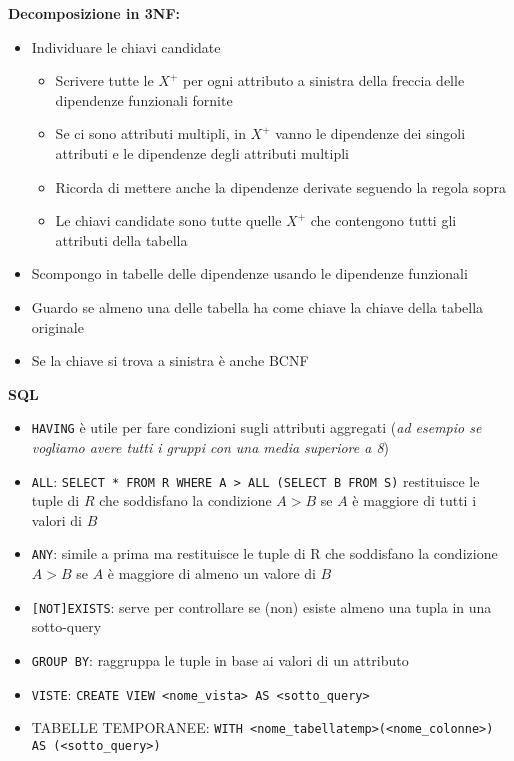 \documentclass[10pt]{article}
\begin{document}
\textbf{Decomposizione in 3NF:}
\begin{itemize}
    \item Individuare le chiavi candidate \begin{itemize}
        \item Scrivere tutte le $X^{+}$ per ogni attributo a sinistra della freccia delle dipendenze funzionali fornite
        \item Se ci sono attributi multipli, in $X^{+}$ vanno le dipendenze dei singoli attributi e le dipendenze degli attributi multipli
        \item Ricorda di mettere anche la dipendenze derivate seguendo la regola sopra
        \item Le chiavi candidate sono tutte quelle $X^{+}$ che contengono tutti gli attributi della tabella
    \end{itemize}
    \item Scompongo in tabelle delle dipendenze usando le dipendenze funzionali
    \item Guardo se almeno una delle tabella ha come chiave la chiave della tabella originale
    \item Se la chiave si trova a sinistra è anche BCNF
\end{itemize}
\textbf{SQL}
\begin{itemize}
    \item \texttt{HAVING} è utile per fare condizioni sugli attributi aggregati (\textit{ad esempio se vogliamo avere tutti i gruppi con una media superiore a 8})
    \item \texttt{ALL}: \texttt{SELECT * FROM R WHERE A > ALL (SELECT B FROM S)} restituisce le tuple di $R$ che soddisfano la condizione $A>B$ se $A$ è maggiore di tutti i valori di $B$
    \item \texttt{ANY}: simile a prima ma restituisce le tuple di R che soddisfano la condizione $A>B$ se $A$ è maggiore di almeno un valore di $B$
    \item \texttt{[NOT]EXISTS}: serve per controllare se (non) esiste almeno una tupla in una sotto-query
    \item \texttt{GROUP BY}: raggruppa le tuple in base ai valori di un attributo
    \item \texttt{VISTE}: \texttt{CREATE VIEW <nome\_vista> AS <sotto\_query>}
    \item TABELLE TEMPORANEE: \texttt{WITH <nome\_tabellatemp>(<nome\_colonne>) AS (<sotto\_query>)}
\end{itemize}
\end{document}
